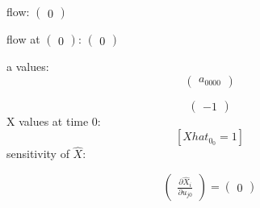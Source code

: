 \documentclass{article}
\begin{document}
flow: $\left(\begin{array}{c}
  0
\end{array}\right)$

flow at $\left(\begin{array}{c}
  0
\end{array}\right)$: $\left(\begin{array}{c}
  0
\end{array}\right)$

a values:
\[\left(\begin{array}{r}
a_{0000}
\end{array}\right)\]

\[\left(\begin{array}{r}
-1
\end{array}\right)\]
X values at time 0:
\[\left[\mathit{Xhat}_{0_{0}} = 1\right]\]
sensitivity of $\hat{X}$:

\[
  \left(\begin{array}{r}
\frac{\partial\hat{X}_i}{\partial u_{j0}}
\end{array}\right) = \left(\begin{array}{r}
0
\end{array}\right)
\]
\end{document}
